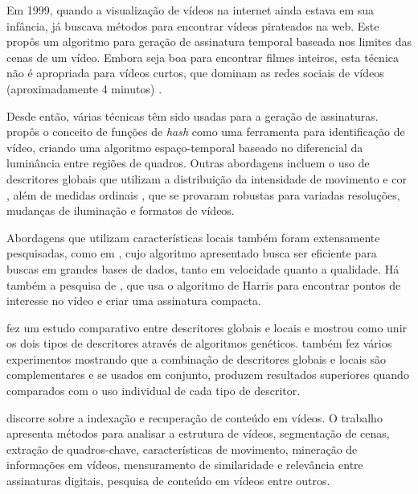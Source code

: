Em 1999, quando a visualização de vídeos na internet ainda estava em sua infância, \cite{indyk1999finding} já buscava métodos para encontrar vídeos pirateados na web. Este propôs um algoritmo para geração de assinatura temporal baseada nos limites das cenas de um vídeo. Embora seja boa para encontrar filmes inteiros, esta técnica não é apropriada para vídeos curtos, que dominam as redes sociais de vídeos (aproximadamente 4 minutos) \cite{comscoreinc}.

Desde então, várias técnicas têm sido usadas para a geração de assinaturas. \cite{coskun2006spatio} propôs o conceito de funções de \textit{hash} como uma ferramenta para identificação de vídeo, criando uma algoritmo espaço-temporal baseado no diferencial da luminância entre regiões de quadros. Outras abordagens incluem o uso de descritores globais que utilizam a distribuição da intensidade de movimento e cor \cite{hampapur2001comparison}, além de medidas ordinais \cite{hua2004robust}, que se provaram robustas para variadas resoluções, mudanças de iluminação e formatos de vídeos.	   	

Abordagens que utilizam características locais também foram extensamente pesquisadas, como em \cite{joly2007content}, cujo algoritmo apresentado busca ser eficiente para buscas em grandes bases de dados, tanto em velocidade quanto a qualidade. Há também a  pesquisa de \cite{law2006robust}, que usa o algoritmo de Harris para encontrar pontos de interesse no vídeo e criar uma assinatura compacta.

\cite{de2012combinaccao} fez um estudo comparativo entre descritores globais e locais e mostrou como unir os dois tipos de descritores através de algoritmos genéticos. \cite{de2012combinaccao} também fez vários experimentos mostrando que a combinação de descritores globais e locais são complementares e se usados em conjunto, produzem resultados superiores quando comparados com o uso individual de cada tipo de descritor.

\cite{hu2011survey} discorre sobre a indexação e recuperação de conteúdo em vídeos. O trabalho apresenta métodos para analisar a estrutura de vídeos, segmentação de cenas, extração de quadros-chave, características de movimento, mineração de informações em vídeos, mensuramento de similaridade e relevância entre assinaturas digitais, pesquisa de conteúdo em vídeos entre outros.

